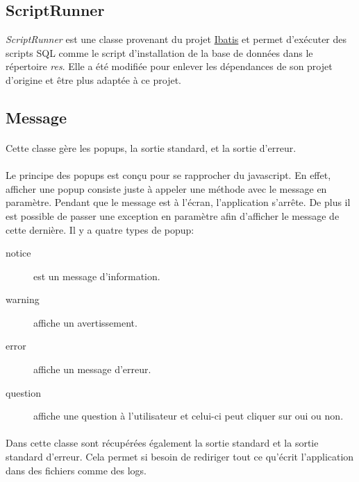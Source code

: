 \documentclass[a4paper,10pt]{report}
\begin{document}
		\subsection{ScriptRunner}

			\textit{ScriptRunner} est une classe provenant du projet \href{http://ibatis.apache.org/}{Ibatis} et permet d’exécuter des scripts SQL comme le script d'installation de la base de données dans le répertoire \textit{res}. Elle a été modifiée pour enlever les dépendances de son projet d'origine et être plus adaptée à ce projet.

		\subsection{Message}

			\paragraph*{}
			Cette classe gère les popups, la sortie standard, et la sortie d’erreur.

			\paragraph*{}
			Le principe des popups est conçu pour se rapprocher du javascript. En effet, afficher une popup consiste juste à appeler une méthode avec le message en paramètre. Pendant que le message est à l’écran, l'application s'arrête. De plus il est possible de passer une exception en paramètre afin d'afficher le message de cette dernière.
			Il y a quatre types de popup:
			\begin{description}
				\item[notice] est un message d'information.
				\item[warning] affiche un avertissement.
				\item[error] affiche un message d'erreur.
				\item[question] affiche une question à l'utilisateur et celui-ci peut cliquer sur oui ou non.
			\end{description}

			\paragraph*{}
			Dans cette classe sont récupérées également la sortie standard  et la sortie standard d’erreur. Cela permet si besoin de rediriger tout ce qu’écrit l'application dans des fichiers comme des logs.
\end{document}

